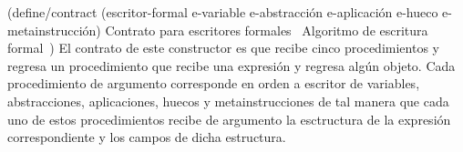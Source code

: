 \documentclass[10pt,oneside,openany,letterpaper]{book}
\begin{document}
\nwenddocs{}\endmoddef
(define/contract (escritor-formal e-variable e-abstracción e-aplicación
                                  e-hueco e-metainstrucción)
  \LA{}Contrato para escritores formales~{\nwtagstyle{}}\RA{}
  \LA{}Algoritmo de escritura formal~{\nwtagstyle{}}\RA{})
\eatline
{}\nwendcode{}\nwdocspar
El contrato de este constructor es que recibe cinco procedimientos y regresa un procedimiento que recibe una expresión y regresa algún objeto. Cada procedimiento de argumento corresponde en orden a escritor de variables, abstracciones, aplicaciones, huecos y metainstrucciones de tal manera que cada uno de estos procedimientos recibe de argumento la esctructura de la expresión correspondiente y los campos de dicha estructura.
\end{document}
